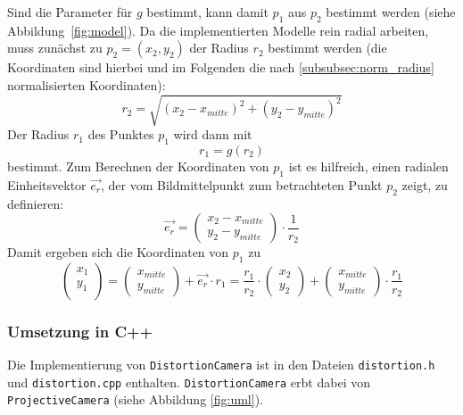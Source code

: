 Sind die Parameter für $g$ bestimmt, kann damit $p_1$ aus $p_2$ bestimmt werden (siehe Abbildung~\ref{fig:model}). Da die implementierten Modelle rein radial arbeiten, muss zunächst zu $p_2 = (x_2, y_2)$ der Radius $r_2$ bestimmt werden (die Koordinaten sind hierbei und im Folgenden die nach \ref{subsubsec:norm_radius} normalisierten Koordinaten):
\begin{equation}
r_2 = \sqrt{ (x_2 - x_{mitte})^2 + (y_2 - y_{mitte})^2 }
\end{equation}
Der Radius $r_1$ des Punktes $p_1$ wird dann mit 
\begin{equation}
r_1 = g(r_2)
\end{equation}
bestimmt. Zum Berechnen der Koordinaten von $p_1$ ist es hilfreich, einen radialen Einheitsvektor $\overrightarrow{e_r}$, der vom Bildmittelpunkt zum betrachteten Punkt $p_2$ zeigt, zu definieren:
\begin{equation}
\overrightarrow{e_r} = \begin{pmatrix} x_2 - x_{mitte} \\ y_2 - y_{mitte} \end{pmatrix} \cdot \frac{1}{r_2}
\end{equation}
Damit ergeben sich die Koordinaten von $p_1$ zu 
\begin{equation}
\begin{pmatrix} x_1 \\ y_1\\ \end{pmatrix} = 
\begin{pmatrix} x_{mitte} \\ y_{mitte} \end{pmatrix} + 
\overrightarrow{e_r} \cdot r_1 =
\frac{r_1}{r_2} \cdot
\begin{pmatrix} x_2 \\ y_2 \end{pmatrix} + 
\begin{pmatrix} x_{mitte} \\ y_{mitte} \end{pmatrix} \cdot
\frac{r_1}{r_2}
\end{equation}

\subsubsection{Umsetzung in C++}
Die Implementierung von \texttt{DistortionCamera} ist in den Dateien \texttt{distortion.h} und \linebreak \texttt{distortion.cpp} enthalten. \texttt{DistortionCamera} erbt dabei von \texttt{ProjectiveCamera} (siehe Abbildung \ref{fig:uml}).

